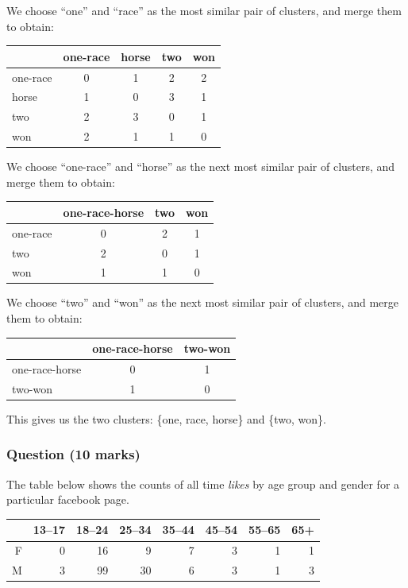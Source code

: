 \documentclass[a4paper,oneside]{book}
\begin{document}
We choose ``one'' and ``race'' as the most similar pair of clusters, and merge them to obtain:
\begin{center}
\begin{tabular}{lcccc}
\hline
  & one-race & horse & two & won \\
\hline
one-race  & 0 & 1 & 2 & 2 \\
horse     & 1 & 0 & 3 & 1 \\
two       & 2 & 3 & 0 & 1 \\
won       & 2 & 1 & 1 & 0 \\
\hline
\end{tabular}
\end{center}

We choose ``one-race'' and ``horse'' as the next most similar pair of clusters, and merge them to obtain:
\begin{center}
\begin{tabular}{lccc}
\hline
  & one-race-horse & two & won \\
\hline
one-race  & 0 & 2 & 1 \\
two       & 2 & 0 & 1 \\
won       & 1 & 1 & 0 \\
\hline
\end{tabular}
\end{center}

We choose ``two'' and ``won'' as the next most similar pair of clusters, and merge them to obtain:
\begin{center}
\begin{tabular}{lcc}
\hline
  & one-race-horse & two-won \\
\hline
one-race-horse  & 0 & 1 \\
two-won         & 1 & 0 \\
\hline
\end{tabular}
\end{center}

This gives us the two clusters: \{one, race, horse\} and \{two, won\}.

\subsubsection*{Question (10 marks)}

The table below shows the counts of all time \emph{likes} by age group and gender for a particular facebook page.

\begin{center}
\begin{tabular}{rrrrrrrr}
  \hline
 & 13--17 & 18--24 & 25--34 & 35--44 & 45--54 & 55--65 & 65+ \\ 
  \hline
F & 0 & 16 & 9 & 7 & 3 & 1 & 1 \\ 
  M & 3 & 99 & 30 & 6 & 3 & 1 & 3 \\ 
   \hline
\end{tabular}
\end{center}
\end{document}
